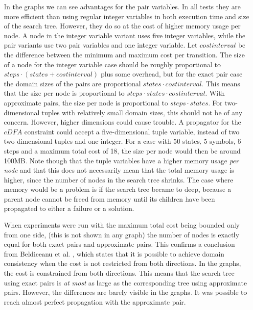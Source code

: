 \documentclass[a4paper,11pt]{article}
\begin{document}
In the graphs we can see advantages for the pair variables. In all tests they are more efficient than using regular integer variables in both execution time and size of the search tree. However, they do so at the cost of higher memory usage per node. A node in the integer variable variant uses five integer variables, while the pair variants use two pair variables and one integer variable. Let $\mathit{costinterval}$ be the difference between the minimum and maximum cost per transition. The size of a node for the integer variable case should be roughly proportional to $\mathit{steps}\cdot (\mathit{states} + \mathit{costinterval})$ plus some overhead, but for the exact pair case the domain sizes of the pairs are proportional $\mathit{states} \cdot \mathit{costinterval}$. This means that the size per node is proportional to $\mathit{steps}\cdot \mathit{states}\cdot \mathit{costinterval}$. With approximate pairs, the size per node is proportional to $\mathit{steps}\cdot \mathit{states}$. For two-dimensional tuples with relatively small domain sizes, this should not be of any concern. However, higher dimensions could cause trouble. A propagator for the $\mathit{cDFA}$ constraint could accept a five-dimensional tuple variable, instead of two two-dimensional tuples and one integer. For a case with 50 states, 5 symbols, 6 steps and a maximum total cost of 18, the size per node would then be around 100MB. Note though that the tuple variables have a higher memory usage \textit{per node} and that this does not necessarily mean that the total memory usage is higher, since the number of nodes in the search tree shrinks. The case where memory would be a problem is if the search tree became to deep, because a parent node cannot be freed from memory until its children have been propagated to either a failure or a solution.

When experiments were run with the maximum total cost being bounded only from one side, (this is not shown in any graph) the number of nodes is exactly equal for both exact pairs and approximate pairs. This confirms a conclusion from Beldiceanu et al. \cite{Beldiceanu675954}, which states that it is possible to achieve domain consistency when the cost is not restricted from both directions. In the graphs, the cost is constrained from both directions. This means that the search tree using exact pairs is \textit{at most} as large as the corresponding tree using approximate pairs. However, the differences are barely visible in the graphs. It was possible to reach almost perfect propagation with the approximate pair.
\end{document}
